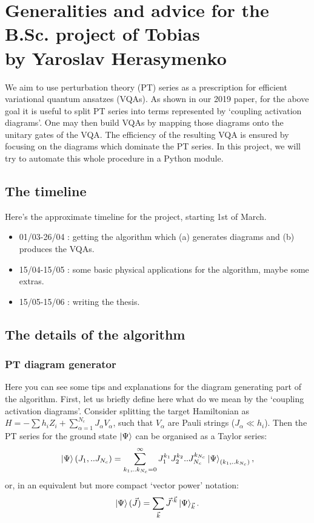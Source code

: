 \documentclass[10pt, a4paper]{article}
\begin{document}
\section*{Generalities and advice for the B.Sc. project of Tobias\\
\small{by Yaroslav Herasymenko}}


We aim to use perturbation theory (PT) series as a prescription for efficient variational quantum ansatzes (VQAs). As shown in our 2019 paper, for the above goal it is useful to split PT series into terms represented by `coupling activation diagrams'. One may then build VQAs by mapping those diagrams onto the unitary gates of the VQA. The efficiency of the resulting VQA is ensured by focusing on the diagrams which dominate the PT series. In this project, we will try to automate this whole procedure in a Python module.

\subsection*{The timeline}

Here's the approximate timeline for the project, starting 1st of March.

\begin{itemize}
\item 01/03-26/04 : getting the algorithm which (a) generates diagrams and (b) produces the VQAs.
\item 15/04-15/05 : some basic physical applications for the algorithm, maybe some extras.
\item 15/05-15/06 : writing the thesis.
\end{itemize}

\subsection*{The details of the algorithm}

\subsubsection*{PT diagram generator}

Here you can see some tips and explanations for the diagram generating part of the algorithm. First, let us briefly define here what do we mean by the `coupling activation diagrams'. Consider splitting the target Hamiltonian as $H=-\sum h_iZ_i+\sum^{N_c}_{\alpha=1} J_\alpha V_\alpha$, such that $V_\alpha$ are Pauli strings ($J_\alpha\ll h_i$). Then the PT series for the ground state $\ket{\Psi}$ can be organised as a Taylor series:
\begin{equation}
\ket{\Psi}(J_1,..J_{N_c})=\sum^\infty_{k_1,..k_{N_c}=0} J^{k_1}_1J^{k_2}_2..J^{k_{N_c}}_{N_c}\ket{\Psi}_{(k_1,..k_{N_c})},
\end{equation}
or, in an equivalent but more compact `vector power' notation:
\begin{equation}
\ket{\Psi}(\vec{J})=\sum_{\vec{k}}\vec{J}^{\cdot\vec{k}}\ket{\Psi}_{\vec{k}}.
\label{eq:vector_power_Taylor}
\end{equation}
\end{document}
